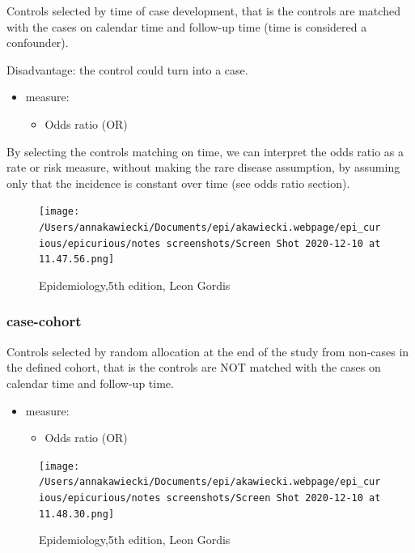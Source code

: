 \documentclass[
]{article}
\providecommand{\tightlist}{%
  \setlength{\itemsep}{0pt}\setlength{\parskip}{0pt}}
\begin{document}
Controls selected by time of case development, that is the controls are
matched with the cases on calendar time and follow-up time (time is
considered a confounder).

Disadvantage: the control could turn into a case.

\begin{itemize}
\item
  measure:

  \begin{itemize}
  \tightlist
  \item
    Odds ratio (OR)
  \end{itemize}
\end{itemize}

By selecting the controls matching on time, we can interpret the odds
ratio as a rate or risk measure, without making the rare disease
assumption, by assuming only that the incidence is constant over time
(see odds ratio section).

\begin{figure}
\centering
\texttt{[image: /Users/annakawiecki/Documents/epi/akawiecki.webpage/epi\_curious/epicurious/notes screenshots/Screen Shot 2020-12-10 at 11.47.56.png]}
\caption{Epidemiology,5th edition, Leon Gordis}
\end{figure}

\hypertarget{case-cohort}{%
\subsubsection{case-cohort}\label{case-cohort}}

Controls selected by random allocation at the end of the study from
non-cases in the defined cohort, that is the controls are NOT matched
with the cases on calendar time and follow-up time.

\begin{itemize}
\item
  measure:

  \begin{itemize}
  \tightlist
  \item
    Odds ratio (OR)
  \end{itemize}
\end{itemize}

\begin{figure}
\centering
\texttt{[image: /Users/annakawiecki/Documents/epi/akawiecki.webpage/epi\_curious/epicurious/notes screenshots/Screen Shot 2020-12-10 at 11.48.30.png]}
\caption{Epidemiology,5th edition, Leon Gordis}
\end{figure}
\end{document}
